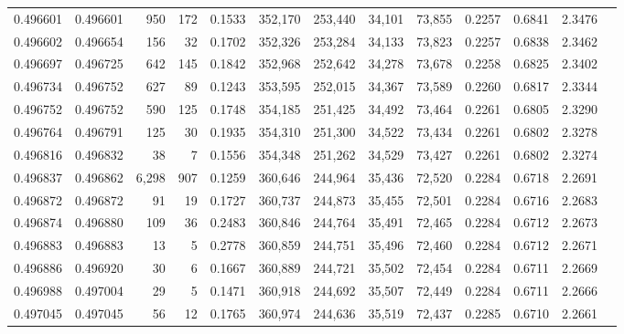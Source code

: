 \begin{tabular}{rrrrrrrrrrrrr}
0.496601 & 0.496601 &   950 &   172 &                                     0.1533 & 352,170 & 253,440 &  34,101 &  73,855 & 0.2257 & 0.6841 & 2.3476 \\
0.496602 & 0.496654 &   156 &    32 &                                     0.1702 & 352,326 & 253,284 &  34,133 &  73,823 & 0.2257 & 0.6838 & 2.3462 \\
0.496697 & 0.496725 &   642 &   145 &                                     0.1842 & 352,968 & 252,642 &  34,278 &  73,678 & 0.2258 & 0.6825 & 2.3402 \\
0.496734 & 0.496752 &   627 &    89 &                                     0.1243 & 353,595 & 252,015 &  34,367 &  73,589 & 0.2260 & 0.6817 & 2.3344 \\
0.496752 & 0.496752 &   590 &   125 &                                     0.1748 & 354,185 & 251,425 &  34,492 &  73,464 & 0.2261 & 0.6805 & 2.3290 \\
0.496764 & 0.496791 &   125 &    30 &                                     0.1935 & 354,310 & 251,300 &  34,522 &  73,434 & 0.2261 & 0.6802 & 2.3278 \\
0.496816 & 0.496832 &    38 &     7 &                                     0.1556 & 354,348 & 251,262 &  34,529 &  73,427 & 0.2261 & 0.6802 & 2.3274 \\
0.496837 & 0.496862 & 6,298 &   907 &                                     0.1259 & 360,646 & 244,964 &  35,436 &  72,520 & 0.2284 & 0.6718 & 2.2691 \\
0.496872 & 0.496872 &    91 &    19 &                                     0.1727 & 360,737 & 244,873 &  35,455 &  72,501 & 0.2284 & 0.6716 & 2.2683 \\
0.496874 & 0.496880 &   109 &    36 &                                     0.2483 & 360,846 & 244,764 &  35,491 &  72,465 & 0.2284 & 0.6712 & 2.2673 \\
0.496883 & 0.496883 &    13 &     5 &                                     0.2778 & 360,859 & 244,751 &  35,496 &  72,460 & 0.2284 & 0.6712 & 2.2671 \\
0.496886 & 0.496920 &    30 &     6 &                                     0.1667 & 360,889 & 244,721 &  35,502 &  72,454 & 0.2284 & 0.6711 & 2.2669 \\
0.496988 & 0.497004 &    29 &     5 &                                     0.1471 & 360,918 & 244,692 &  35,507 &  72,449 & 0.2284 & 0.6711 & 2.2666 \\
0.497045 & 0.497045 &    56 &    12 &                                     0.1765 & 360,974 & 244,636 &  35,519 &  72,437 & 0.2285 & 0.6710 & 2.2661 \\

\end{tabular}
